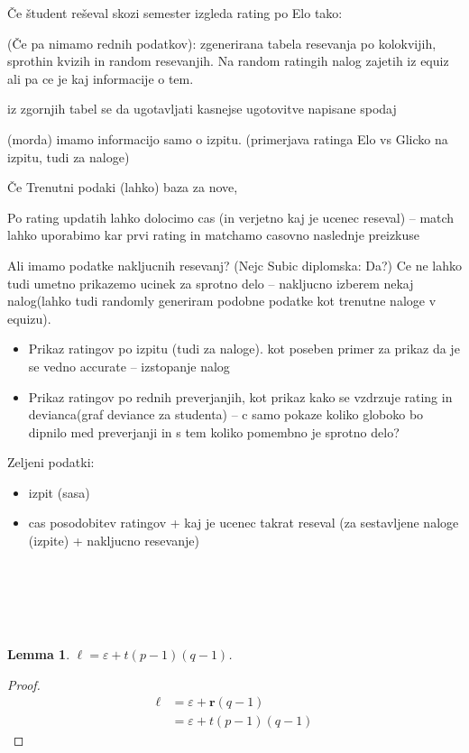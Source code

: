 \documentclass{IEEEtran}
\newcommand{\B}[1]{\ensuremath{\boldsymbol{#1}}}
\newtheorem{lemma}[theorem]{Lemma}
\begin{document}
\iffalse
Če študent reševal skozi semester izgleda rating po Elo tako: 

(Če pa nimamo rednih podatkov):
zgenerirana tabela resevanja po kolokvijih, sprothin kvizih in random resevanjih. Na random ratingih nalog zajetih iz equiz ali
pa ce je kaj informacije o tem.

iz zgornjih tabel se da ugotavljati kasnejse ugotovitve napisane spodaj

(morda) imamo informacijo samo o izpitu.
(primerjava ratinga Elo vs Glicko na izpitu, tudi za naloge)

Če 
Trenutni podaki (lahko) baza za nove,

Po rating updatih lahko dolocimo cas (in verjetno kaj je ucenec reseval) -- match lahko uporabimo kar prvi rating in matchamo casovno naslednje preizkuse

Ali imamo podatke nakljucnih resevanj? (Nejc Subic diplomska: Da?)
Ce ne lahko tudi umetno prikazemo ucinek za sprotno delo -- nakljucno izberem nekaj nalog(lahko tudi randomly generiram podobne podatke kot trenutne naloge v equizu).

\begin{itemize}
    \item Prikaz ratingov po izpitu (tudi za naloge). kot poseben primer za prikaz da je se vedno accurate -- izstopanje nalog
    \item Prikaz ratingov po rednih preverjanjih, kot prikaz kako se vzdrzuje rating in devianca(graf deviance za studenta) -- c samo pokaze koliko globoko bo dipnilo med preverjanji in s tem koliko pomembno je sprotno delo?
\end{itemize}

Zeljeni podatki:
\begin{itemize}
    \item izpit (sasa)
    \item cas posodobitev ratingov + kaj je ucenec takrat reseval (za sestavljene naloge (izpite) + nakljucno resevanje)
\end{itemize}
\hfill
\\
\\

\hfill
\\
\\
\begin{lemma} \label{lem:eps}
$\ell = \varepsilon + t(p-1)(q-1)$.
\end{lemma}

\begin{proof}
\begin{align*}
\ell &= \varepsilon + \B{r}(q-1) \\
&= \varepsilon + t(p-1)(q-1)
\end{align*}
\end{proof}
\end{document}
